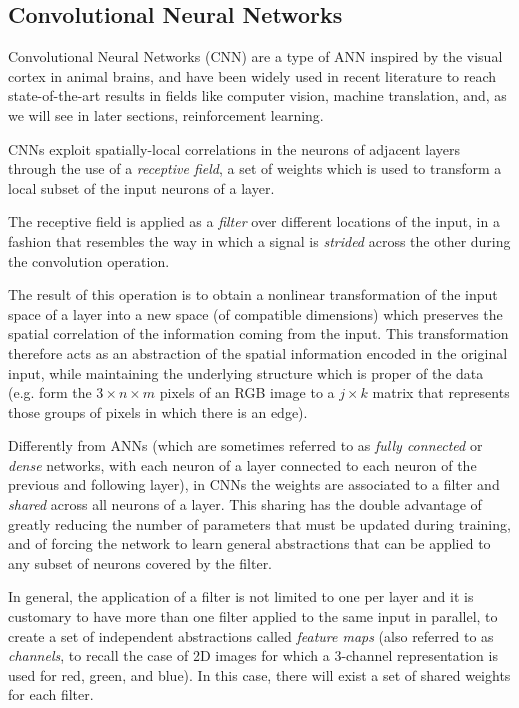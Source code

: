 \subsection{Convolutional Neural Networks} \label{s:CNN}
Convolutional Neural Networks (CNN) are a type of ANN inspired by the visual 
cortex in animal brains, and have been widely used in recent literature to 
reach state-of-the-art results in fields like computer vision, machine 
translation, and, as we will see in later sections, reinforcement learning.

CNNs exploit spatially-local correlations in the neurons of adjacent 
layers through the use of a \textit{receptive field}, a set of weights which is 
used to transform a local subset of the input neurons of a layer.

The receptive field is applied as a \textit{filter} over different locations of 
the input, in a fashion that resembles the way in which a signal is 
\textit{strided} across the other during the convolution operation.

The result of this operation is to obtain a nonlinear transformation of 
the input space of a layer into a new space (of compatible dimensions) which
preserves the spatial correlation of the information coming from the input.
This transformation therefore acts as an abstraction of the spatial information 
encoded in the original input, while maintaining the underlying structure which
is proper of the data (e.g. form the $3 \times n \times m$ pixels of an RGB 
image to a $j \times k$ matrix that represents those groups of pixels in which 
there is an edge).

Differently from ANNs (which are sometimes referred to as \textit{fully connected}
or \textit{dense} networks, with each neuron of a layer connected to each neuron 
of the previous and following layer), in CNNs the weights are associated to a 
filter and \textit{shared} across all neurons of a layer. This sharing has the 
double advantage of greatly reducing the number of parameters that must be
updated during training, and of forcing the network to learn general abstractions
that can be applied to any subset of neurons covered by the filter.

In general, the application of a filter is not limited to one per layer and it 
is customary to have more than one filter applied to the same input in parallel,
to create a set of independent abstractions called \textit{feature maps} (also
referred to as \textit{channels}, to recall the case of 2D images for which 
a 3-channel representation is used for red, green, and blue). In 
this case, there will exist a set of shared weights for each filter.

